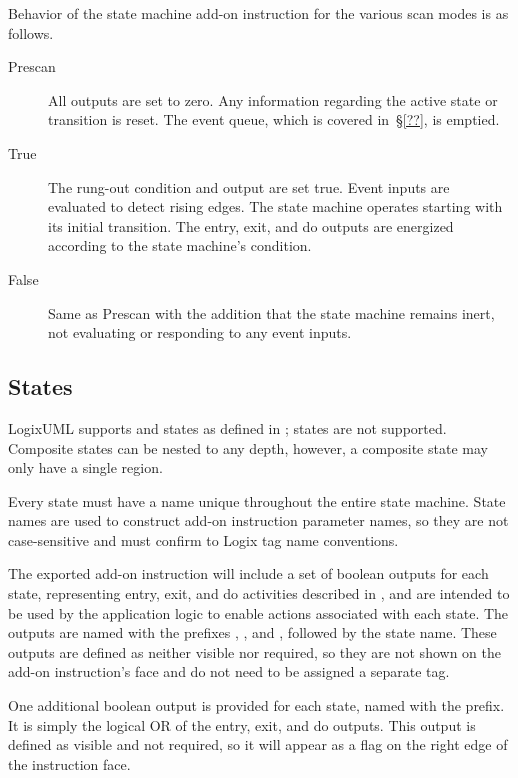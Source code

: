 Behavior of the state machine add-on instruction for the various scan
modes is as follows.

\begin{description}
  \item[Prescan] All outputs are set to zero. Any information regarding
    the active state or transition is reset. The event queue, which is
    covered in~\S\ref{??}, is emptied.

  \item[True] The rung-out condition and  output are set
    true. Event inputs are evaluated to detect rising edges. The state machine
    operates starting with its initial transition. The entry, exit, and
    do outputs are energized according to the state machine's condition.

  \item[False] Same as Prescan with the addition that the state machine
    remains inert, not evaluating or responding to any event inputs.
\end{description}


\subsection{States}
\label{ss:states}

LogixUML supports  and
 states as defined in
\textcite[\S14.2.3.4.1]{OMGUML};  states are
not supported. Composite states can be nested to any depth, however, a
composite state may only have a single region.

Every state must have a name unique throughout the entire state
machine. State names are used to construct add-on instruction parameter names,
so they are not case-sensitive and must confirm to Logix tag name
conventions.

The exported add-on instruction will include a set of boolean outputs
for each state, representing entry, exit, and do activities described
in \textcite[\S14.2.3.4.3]{OMGUML}, and are intended to
be used by the application logic to enable actions associated with each
state. The outputs are named with the prefixes
, , and
, followed by the state name. These outputs are defined
as neither visible nor required, so they are not shown on the add-on
instruction's face and do not need to be assigned a separate tag.

One additional boolean output is provided for each state, named with the
 prefix. It is simply the logical OR of the
entry, exit, and do outputs. This output is defined as visible and not
required, so it will appear as a flag on the right edge of the
instruction face.


